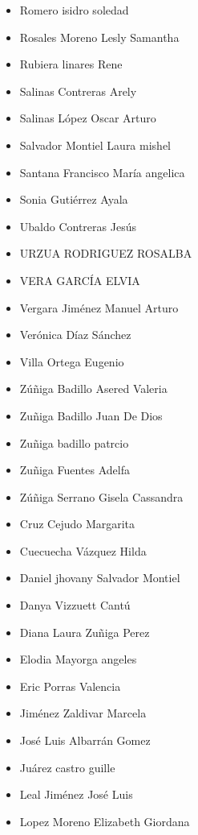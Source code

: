 \begin{spacing}{0.5}
\begin{paracol}{2}
\begin{itemize}
\item Romero isidro soledad
\item Rosales Moreno Lesly Samantha
\item Rubiera linares Rene
\item Salinas Contreras Arely
\item Salinas López Oscar Arturo
\item Salvador Montiel Laura mishel
\item Santana Francisco María angelica
\item Sonia Gutiérrez Ayala
\item Ubaldo Contreras Jesús
\item URZUA RODRIGUEZ ROSALBA
\item VERA GARCÍA ELVIA
\item Vergara Jiménez Manuel Arturo
\item Verónica Díaz Sánchez
\item Villa Ortega Eugenio
\item Zúñiga Badillo Asered Valeria
\item Zuñiga Badillo Juan De Dios
\item Zuñiga badillo patrcio
\item Zuñiga Fuentes Adelfa
\item Zúñiga Serrano Gisela Cassandra
\item Cruz Cejudo Margarita
\item Cuecuecha Vázquez Hilda
\item Daniel jhovany Salvador Montiel
\item Danya Vizzuett Cantú
\item Diana Laura Zuñiga Perez
\item Elodia Mayorga angeles
\item Eric Porras Valencia
\item Jiménez Zaldivar Marcela
\item José Luis Albarrán Gomez
\item Juárez castro guille
\item Leal Jiménez José Luis
\item Lopez Moreno Elizabeth Giordana
\end{itemize}
\end{paracol}
\end{spacing}


